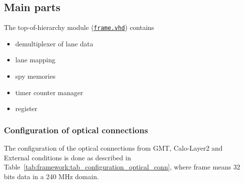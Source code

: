 \clearpage

\subsection{Main parts}

The top-of-hierarchy module (\href{https://github.com/cms-l1-globaltrigger/mp7_ugt_legacy/blob/master/firmware/hdl/payload/frame.vhd}{\texttt{frame.vhd}}) contains
\begin {itemize}
\item demultiplexer of lane data
\item lane mapping
\item spy memories
\item timer counter manager
\item register
\end {itemize}

\subsubsection{Configuration of optical connections} \label{sec:framework:sec_configuration_optical_conn}
The configuration of the optical connections from GMT, Calo-Layer2 and External conditions is done as described in Table~\ref{tab:framework:tab_configuration_optical_conn}, where frame means 32 bits data in a 240 MHz domain.

